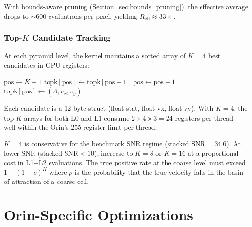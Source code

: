 \documentclass[11pt,letterpaper]{article}
\newcommand{\snr}{\mathrm{SNR}}
\begin{document}
With bounds-aware pruning (Section~\ref{sec:bounds_pruning}), the
effective average drops to ${\sim}600$ evaluations per pixel,
yielding $R_{\text{eff}} \approx 33\times$.

\subsubsection{Top-$K$ Candidate Tracking}

At each pyramid level, the kernel maintains a sorted array of $K=4$
best candidates in GPU registers:

\begin{algorithm}[H]
\caption{Top-$K$ Insertion (per-thread, in registers)}
\label{alg:topk}
\begin{algorithmic}[1]
        \State \Return {}
    \EndIf
    \State $\text{pos} \gets K{-}1$
        \State $\text{topk}[\text{pos}] \gets \text{topk}[\text{pos}{-}1]$
        \State $\text{pos} \gets \text{pos} - 1$
    \EndWhile
    \State $\text{topk}[\text{pos}] \gets (\Lambda, v_x, v_y)$
\EndProcedure
\end{algorithmic}
\end{algorithm}

Each candidate is a 12-byte struct (float stat, float vx, float vy).
With $K=4$, the top-$K$ arrays for both L0 and L1 consume
$2 \times 4 \times 3 = 24$ registers per thread---well within the
Orin's 255-register limit per thread.

\begin{warnbox}
$K=4$ is conservative for the benchmark SNR regime (stacked $\snr=34.6$).
At lower SNR (stacked $\snr < 10$), increase to $K=8$ or $K=16$ at a
proportional cost in L1+L2 evaluations. The true positive rate at the
coarse level must exceed $1 - (1-p)^K$ where $p$ is the probability that
the true velocity falls in the basin of attraction of a coarse cell.
\end{warnbox}


\section{Orin-Specific Optimizations}
\label{sec:optimizations}
\end{document}
